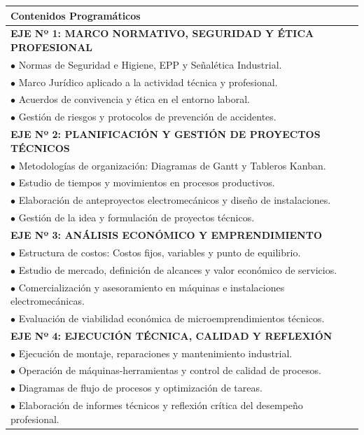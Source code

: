 \documentclass[11pt, a4paper]{article}
\begin{document}
\begin{longtable}{|p{\dimexpr\textwidth-2\tabcolsep-2\arrayrulewidth}|}
\hline
\rowcolor{gray!20} \textbf{Contenidos Programáticos} \\
\hline
\textbf{EJE Nº 1: MARCO NORMATIVO, SEGURIDAD Y ÉTICA PROFESIONAL} \\
$\bullet$ Normas de Seguridad e Higiene, EPP y Señalética Industrial. \\
$\bullet$ Marco Jurídico aplicado a la actividad técnica y profesional. \\
$\bullet$ Acuerdos de convivencia y ética en el entorno laboral. \\
$\bullet$ Gestión de riesgos y protocolos de prevención de accidentes. \\
\hline
\textbf{EJE Nº 2: PLANIFICACIÓN Y GESTIÓN DE PROYECTOS TÉCNICOS} \\
$\bullet$ Metodologías de organización: Diagramas de Gantt y Tableros Kanban. \\
$\bullet$ Estudio de tiempos y movimientos en procesos productivos. \\
$\bullet$ Elaboración de anteproyectos electromecánicos y diseño de instalaciones. \\
$\bullet$ Gestión de la idea y formulación de proyectos técnicos. \\
\hline
\textbf{EJE Nº 3: ANÁLISIS ECONÓMICO Y EMPRENDIMIENTO} \\
$\bullet$ Estructura de costos: Costos fijos, variables y punto de equilibrio. \\
$\bullet$ Estudio de mercado, definición de alcances y valor económico de servicios. \\
$\bullet$ Comercialización y asesoramiento en máquinas e instalaciones electromecánicas. \\
$\bullet$ Evaluación de viabilidad económica de microemprendimientos técnicos. \\
\hline
\textbf{EJE Nº 4: EJECUCIÓN TÉCNICA, CALIDAD Y REFLEXIÓN} \\
$\bullet$ Ejecución de montaje, reparaciones y mantenimiento industrial. \\
$\bullet$ Operación de máquinas-herramientas y control de calidad de procesos. \\
$\bullet$ Diagramas de flujo de procesos y optimización de tareas. \\
$\bullet$ Elaboración de informes técnicos y reflexión crítica del desempeño profesional. \\
\hline
\end{longtable}
\end{document}
